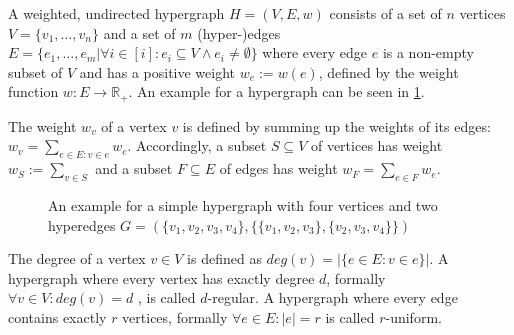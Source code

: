 A weighted, undirected hypergraph $H = (V, E, w)$ consists of a set of $n$ vertices $V = \{v_1, \ldots, v_n\}$ and a set of $m$ (hyper-)edges $E = \{ e_1, \ldots , e_m | \forall i \in [i]: e_i \subseteq V \land e_i \neq \emptyset \} $ where every edge $e$ is a non-empty subset of $V$ and has a positive weight $w_e:= w(e) $, defined by the weight function $w: E \to  \mathbb{R}_+ $. An example for a hypergraph can be seen in \cref{fig:exapmlehypergraph}.


The weight $w_v$ of a vertex $v$ is defined by summing up the weights of its edges: $w_v = \sum_{e\in E: v\in e} w_e$. Accordingly, a subset $S\subseteq V$ of vertices has weight $w_S := \sum_{v\in S}$ and a subset $F \subseteq E $ of edges has weight $w_F = \sum_{e\in F} w_e$.

	
\begin{figure} [htpb]
	\centering
	\caption[Example hypergraph]{An example for a simple hypergraph with four vertices and two hyperedges $G=(\{v_1, v_2, v_3, v_4\},\{\{v_1, v_2, v_3\}, \{v_2,v_3, v_4\}\} )$}\label{fig:exapmlehypergraph}
\end{figure}


The degree of a vertex $v\in V$ is defined as $deg(v) = |\{e\in E: v\in e\}|$.
A hypergraph where every vertex has exactly degree $d$, formally $\forall v\in V : deg(v) =d $ ,  is called $d$-regular. 
A hypergraph where every edge contains exactly $r$ vertices, formally $\forall e\in E : |e| =r $ is called $r$-uniform.

